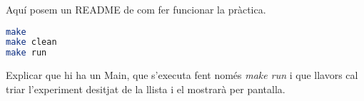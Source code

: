 
Aquí posem un README de com fer funcionar la pràctica.

\begin{lstlisting}[caption=Comandes, label=comandes, language=Bash]
make
make clean
make run
\end{lstlisting}

Explicar que hi ha un Main, que s'executa fent només \emph{make run} i que llavors cal triar l'experiment desitjat de la llista i el mostrarà per pantalla.
